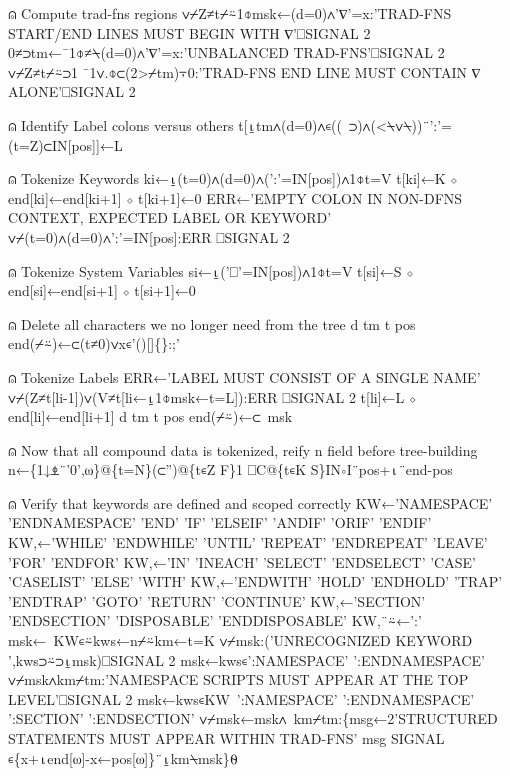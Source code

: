 \documentclass{article}%
\begin{document}
⍝ Compute trad-fns regions
         ∨⌿Z≠t⌿⍨1⌽msk←(d=0)∧'∇'=x:'TRAD-FNS START/END LINES MUST BEGIN WITH ∇'⎕SIGNAL 2
         0≠⊃tm←¯1⌽≠⍀(d=0)∧'∇'=x:'UNBALANCED TRAD-FNS'⎕SIGNAL 2
         ∨⌿Z≠t⌿⍨⊃1 ¯1∨.⌽⊂(2>⌿tm)⍪0:'TRAD-FNS END LINE MUST CONTAIN ∇ ALONE'⎕SIGNAL 2

⍝ Identify Label colons versus others
         t[⍸tm∧(d=0)∧∊((~⊃)∧(<⍀∨⍀))¨':'=(t=Z)⊂IN[pos]]←L

⍝ Tokenize Keywords
         ki←⍸(t=0)∧(d=0)∧(':'=IN[pos])∧1⌽t=V
         t[ki]←K ⋄ end[ki]←end[ki+1] ⋄ t[ki+1]←0
         ERR←'EMPTY COLON IN NON-DFNS CONTEXT, EXPECTED LABEL OR KEYWORD'
         ∨⌿(t=0)∧(d=0)∧':'=IN[pos]:ERR ⎕SIGNAL 2

⍝ Tokenize System Variables
         si←⍸('⎕'=IN[pos])∧1⌽t=V
         t[si]←S ⋄ end[si]←end[si+1] ⋄ t[si+1]←0

⍝ Delete all characters we no longer need from the tree
         d tm t pos end(⌿⍨)←⊂(t≠0)∨x∊'()[]\{\}:;'

⍝ Tokenize Labels
         ERR←'LABEL MUST CONSIST OF A SINGLE NAME'
         ∨⌿(Z≠t[li-1])∨(V≠t[li←⍸1⌽msk←t=L]):ERR ⎕SIGNAL 2
         t[li]←L ⋄ end[li]←end[li+1]
         d tm t pos end(⌿⍨)←⊂~msk

⍝ Now that all compound data is tokenized, reify n field before tree-building
         n←\{1↓⍎¨'0',⍵\}@\{t=N\}(⊂'')@\{t∊Z F\}1 ⎕C@\{t∊K S\}IN∘I¨pos+⍳¨end-pos

⍝ Verify that keywords are defined and scoped correctly
         KW←'NAMESPACE' 'ENDNAMESPACE' 'END' 'IF' 'ELSEIF' 'ANDIF' 'ORIF' 'ENDIF'
         KW,←'WHILE' 'ENDWHILE' 'UNTIL' 'REPEAT' 'ENDREPEAT' 'LEAVE' 'FOR' 'ENDFOR'
         KW,←'IN' 'INEACH' 'SELECT' 'ENDSELECT' 'CASE' 'CASELIST' 'ELSE' 'WITH'
         KW,←'ENDWITH' 'HOLD' 'ENDHOLD' 'TRAP' 'ENDTRAP' 'GOTO' 'RETURN' 'CONTINUE'
         KW,←'SECTION' 'ENDSECTION' 'DISPOSABLE' 'ENDDISPOSABLE'
         KW,¨⍨←':'
         msk←~KW∊⍨kws←n⌿⍨km←t=K
         ∨⌿msk:('UNRECOGNIZED KEYWORD ',kws⊃⍨⊃⍸msk)⎕SIGNAL 2
         msk←kws∊':NAMESPACE' ':ENDNAMESPACE'
         ∨⌿msk∧km⌿tm:'NAMESPACE SCRIPTS MUST APPEAR AT THE TOP LEVEL'⎕SIGNAL 2
         msk←kws∊KW~':NAMESPACE' ':ENDNAMESPACE' ':SECTION' ':ENDSECTION'
         ∨⌿msk←msk∧~km⌿tm:\{msg←2'STRUCTURED STATEMENTS MUST APPEAR WITHIN TRAD-FNS'
                 msg SIGNAL ∊\{x+⍳end[⍵]-x←pos[⍵]\}¨⍸km⍀msk\}⍬
\end{document}
